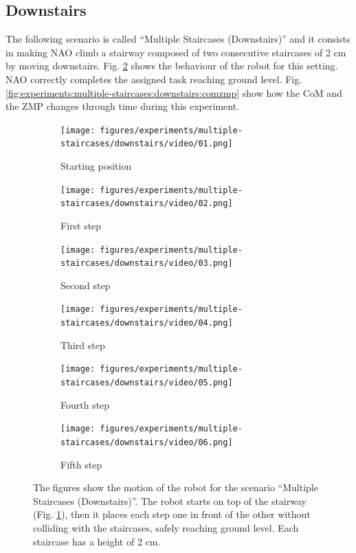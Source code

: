\subsection{Downstairs}
The following scenario is called ``Multiple Staircases (Downstairs)'' and it 
consists in making NAO climb a stairway composed of two consecutive staircases 
of 2 cm by moving downstairs. Fig.
\ref{fig:experiments:multiple-staircases:downstairs:videoframes} shows the 
behaviour of the robot for this setting. NAO correctly completes the assigned 
task reaching ground level. Fig. 
\ref{fig:experiments:multiple-staircases:downstairs:comzmp} show how the CoM and 
the ZMP changes through time during this experiment.
\begin{figure}
  \begin{subfigure}{0.48\textwidth}
    \texttt{[image: figures/experiments/multiple-staircases/downstairs/video/01.png]}
    \caption{Starting position}
    \label{fig:exp:ms:down:frame1}
  \end{subfigure}\hspace*{\fill}
  \begin{subfigure}{0.48\textwidth}
    \texttt{[image: figures/experiments/multiple-staircases/downstairs/video/02.png]}
    \caption{First step}
  \end{subfigure}
  \begin{subfigure}{0.48\textwidth}
    \texttt{[image: figures/experiments/multiple-staircases/downstairs/video/03.png]}
    \caption{Second step}
  \end{subfigure}\hspace*{\fill}
  \begin{subfigure}{0.48\textwidth}
    \texttt{[image: figures/experiments/multiple-staircases/downstairs/video/04.png]}
    \caption{Third step}
  \end{subfigure}
  \begin{subfigure}{0.48\textwidth}
    \texttt{[image: figures/experiments/multiple-staircases/downstairs/video/05.png]}
    \caption{Fourth step}
  \end{subfigure}\hspace*{\fill}
  \begin{subfigure}{0.48\textwidth}
    \texttt{[image: figures/experiments/multiple-staircases/downstairs/video/06.png]}
    \caption{Fifth step}
  \end{subfigure}
  \caption{The figures show the motion of the robot for the scenario
      ``Multiple Staircases (Downstairs)''. The robot starts on top of the 
      stairway (Fig. \ref{fig:exp:ms:down:frame1}), then it places 
      each step one in front of the other without colliding with the staircases,
      safely reaching ground level. Each staircase has a height of 2 cm.}
  \label{fig:experiments:multiple-staircases:downstairs:videoframes}
\end{figure}

